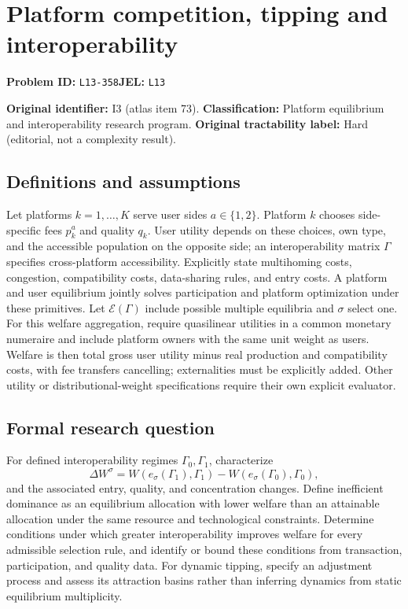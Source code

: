 \documentclass[11pt,a4paper]{article}
\begin{document}
\section*{Platform competition, tipping and interoperability}
\textbf{Problem ID:} \texttt{L13-358}\quad \textbf{JEL:} \texttt{L13}\par
\label{problem:OP-0073}
\label{atlas:prob:I3}

\noindent\textbf{Original identifier:} I3 (atlas item 73). \textbf{Classification:} Platform equilibrium and interoperability research program. \textbf{Original tractability label:} Hard (editorial, not a complexity result).

\subsection*{Definitions and assumptions}

Let platforms $k=1,\ldots,K$ serve user sides $a\in\{1,2\}$. Platform $k$ chooses side-specific fees $p_k^a$ and quality $q_k$. User utility depends on these choices, own type, and the accessible population on the opposite side; an interoperability matrix $\Gamma$ specifies cross-platform accessibility. Explicitly state multihoming costs, congestion, compatibility costs, data-sharing rules, and entry costs. A platform and user equilibrium jointly solves participation and platform optimization under these primitives. Let $\mathcal E(\Gamma)$ include possible multiple equilibria and $\sigma$ select one. For this welfare aggregation, require quasilinear utilities in a common monetary numeraire and include platform owners with the same unit weight as users. Welfare is then total gross user utility minus real production and compatibility costs, with fee transfers cancelling; externalities must be explicitly added. Other utility or distributional-weight specifications require their own explicit evaluator.

\subsection*{Formal research question}

For defined interoperability regimes $\Gamma_0,\Gamma_1$, characterize
\[
\Delta W^\sigma=W(e_\sigma(\Gamma_1),\Gamma_1)-W(e_\sigma(\Gamma_0),\Gamma_0),
\]
and the associated entry, quality, and concentration changes. Define inefficient dominance as an equilibrium allocation with lower welfare than an attainable allocation under the same resource and technological constraints. Determine conditions under which greater interoperability improves welfare for every admissible selection rule, and identify or bound these conditions from transaction, participation, and quality data. For dynamic tipping, specify an adjustment process and assess its attraction basins rather than inferring dynamics from static equilibrium multiplicity.
\end{document}
